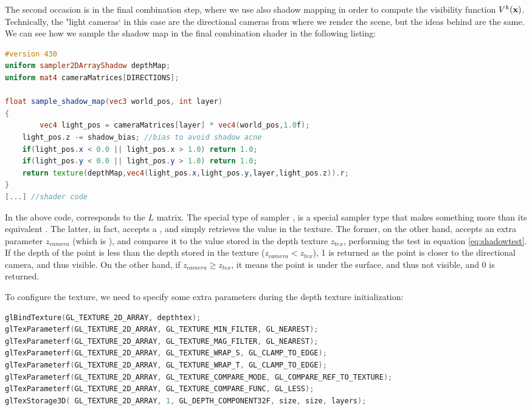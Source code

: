 The second occasion is in the final combination step, where we use also shadow mapping in order to compute the visibility function $V^k(\mathbf{x})$. Technically, the "light cameras` in this case are the directional cameras from where we render the scene, but the ideas behind are the same. We can see how we sample the shadow map in the final combination shader in the following listing:

\begin{lstlisting}[language=GLSL,caption={Sampling of the shadow map texture in step 3 of our method.}]
#version 430
uniform sampler2DArrayShadow depthMap;
uniform mat4 cameraMatrices[DIRECTIONS];

float sample_shadow_map(vec3 world_pos, int layer)
{
		vec4 light_pos = cameraMatrices[layer] * vec4(world_pos,1.0f);
    light_pos.z -= shadow_bias; //bias to avoid shadow acne
    if(light_pos.x < 0.0 || light_pos.x > 1.0) return 1.0;
    if(light_pos.y < 0.0 || light_pos.y > 1.0) return 1.0;
    return texture(depthMap,vec4(light_pos.x,light_pos.y,layer,light_pos.z)).r;
}        
[...] //shader code
\end{lstlisting}

In the above code,  corresponds to the $L$ matrix. The special type of sampler , is a special sampler type that makes something more than its equivalent . The latter, in fact, accepts a , and simply retrieves the value in the texture. The former, on the other hand, accepts an extra parameter $z_{camera}$ (which is ), and compares it to the value stored in the depth texture $z_{tex}$, performing the test in equation \ref{eq:shadowtest}. If the depth of the point is less than the depth stored in the texture ($z_{camera} < z_{tex}$), 1 is returned as the point is closer to the directional camera, and thus visible. On the other hand, if $z_{camera} \ge z_{tex}$, it means the point is under the surface, and thus not visible, and 0 is returned.

To configure the  texture, we need to specify some extra parameters during the depth texture initialization:

\begin{lstlisting}[language=C++,label=lst:textureconfshadow,caption={Configuration of a shadow map depth texture.}]
glBindTexture(GL_TEXTURE_2D_ARRAY, depthtex);
glTexParameterf(GL_TEXTURE_2D_ARRAY, GL_TEXTURE_MIN_FILTER, GL_NEAREST);
glTexParameterf(GL_TEXTURE_2D_ARRAY, GL_TEXTURE_MAG_FILTER, GL_NEAREST);
glTexParameterf(GL_TEXTURE_2D_ARRAY, GL_TEXTURE_WRAP_S, GL_CLAMP_TO_EDGE);
glTexParameterf(GL_TEXTURE_2D_ARRAY, GL_TEXTURE_WRAP_T, GL_CLAMP_TO_EDGE);
glTexParameterf(GL_TEXTURE_2D_ARRAY, GL_TEXTURE_COMPARE_MODE, GL_COMPARE_REF_TO_TEXTURE);
glTexParameterf(GL_TEXTURE_2D_ARRAY, GL_TEXTURE_COMPARE_FUNC, GL_LESS);
glTexStorage3D(	GL_TEXTURE_2D_ARRAY, 1, GL_DEPTH_COMPONENT32F, size, size, layers);
\end{lstlisting}

